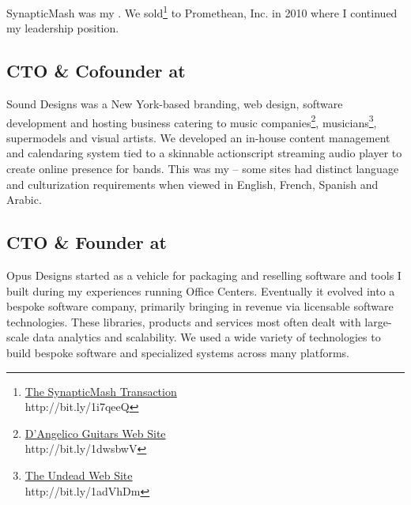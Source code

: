 SynapticMash was my .  We sold\footnote{\href{http://www.inc.com/news/articles/2010/07/synapticmash-acquired-by-promethean.html}{The SynapticMash Transaction}\\ http://bit.ly/1i7qeeQ} to Promethean, Inc. in 2010 where I continued my leadership position.

\subsection{\textbf{CTO \& Cofounder} at  \shyears{[2006-2008]}}
Sound Designs was a New York-based branding, web design, software development and hosting business catering to music companies\footnote{\href{https://web.archive.org/web/20060215201617/http://www.dangelicoguitars.com/guitars.php?}{D'Angelico Guitars Web Site}\\ http://bit.ly/1dwsbwV}, musicians\footnote{\href{https://web.archive.org/web/20070616015006/http://undeadpunk.com/}{The Undead Web Site}\\ http://bit.ly/1adVhDm}, supermodels and visual artists.  We developed an in-house content management and calendaring system tied to a skinnable actionscript streaming audio player to create online presence for bands.  This was my -- some sites had distinct language and culturization requirements when viewed in English, French, Spanish and Arabic.

\subsection{\textbf{CTO \& Founder} at  \shyears{[1997-2008]}}
Opus Designs started as a vehicle for packaging and reselling software and tools I built during my experiences running Office Centers.  Eventually it evolved into a bespoke software company, primarily bringing in revenue via licensable software technologies.  These libraries, products and services most often dealt with large-scale data analytics and scalability.  We used a wide variety of technologies to build bespoke software and specialized systems across many platforms.

